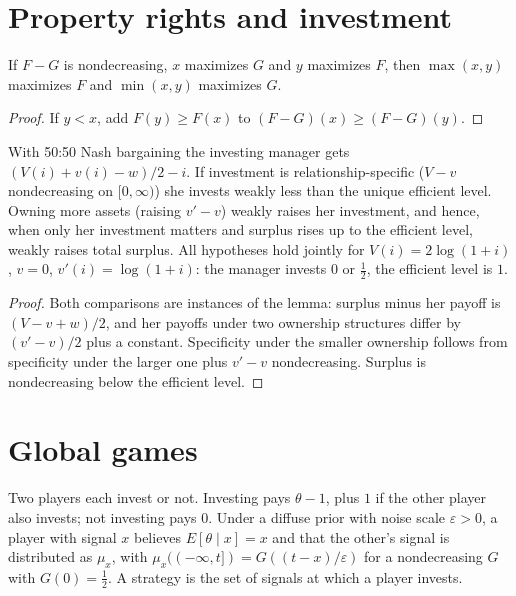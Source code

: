 \section{Property rights and investment}
\label{sec:property-rights}

\begin{lemma}
\label{lem:topkis-1d}
\leanok
If $F - G$ is nondecreasing, $x$ maximizes $G$ and $y$ maximizes $F$, then $\max(x,y)$ maximizes $F$ and
$\min(x,y)$ maximizes $G$.
\end{lemma}
\begin{proof}
\leanok
If $y < x$, add $F(y) \ge F(x)$ to $(F-G)(x) \ge (F-G)(y)$.
\end{proof}

\begin{theorem}
\label{thm:property-rights}
\leanok
{}
With 50:50 Nash bargaining the investing manager gets $(V(i) + v(i) - w)/2 - i$. If investment is
relationship-specific ($V - v$ nondecreasing on $[0,\infty)$) she invests weakly less than the unique efficient
level. Owning more assets (raising $v' - v$) weakly raises her investment, and hence, when only her investment
matters and surplus rises up to the efficient level, weakly raises total surplus. All hypotheses hold jointly for
$V(i) = 2\log(1+i)$, $v = 0$, $v'(i) = \log(1+i)$: the manager invests $0$ or $\tfrac12$, the efficient level is $1$.
\end{theorem}
\begin{proof}
\leanok
Both comparisons are instances of the lemma: surplus minus her payoff is $(V - v + w)/2$, and her payoffs under two
ownership structures differ by $(v' - v)/2$ plus a constant. Specificity under the smaller ownership follows from specificity under the larger one plus $v' - v$
nondecreasing. Surplus is nondecreasing below the efficient level.
\end{proof}

\section{Global games}

Two players each invest or not. Investing pays $\theta - 1$, plus $1$ if the other player also invests; not investing
pays $0$. Under a diffuse prior with noise scale $\varepsilon > 0$, a player with signal $x$ believes $E[\theta \mid x] = x$
and that the other's signal is distributed as $\mu_x$, with $\mu_x((-\infty, t]) = G((t - x)/\varepsilon)$ for a
nondecreasing $G$ with $G(0) = \tfrac12$. A strategy is the set of signals at which a player invests.

